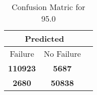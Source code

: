 \begin{table}[] 
\caption{Confusion Matric for 95.0} 
\label{Table: Prediction Accuracy-DMD95.0OnlySunEKF-combinationReflection-Reflection} 
\centering 
\begin{tabular} 
 {@{}ccc@{}} 
\toprule 
\multicolumn{2}{c}{\textbf{Predicted}}
 \\ \midrule 
\multicolumn{1}{|c|}{Failure} & 
\multicolumn{1}{c|}{No Failure}
 \\ \midrule 
\multicolumn{1}{|c|}{\color{green}\textbf{110923}} & 
\multicolumn{1}{c|}{\color{red}\textbf{5687}}
 \\ \midrule 
\multicolumn{1}{|c|}{\color{red}\textbf{2680}} & 
\multicolumn{1}{c|}{\color{green}\textbf{50838}}
 \\ \bottomrule 
\end{tabular} 
\end{table} 
